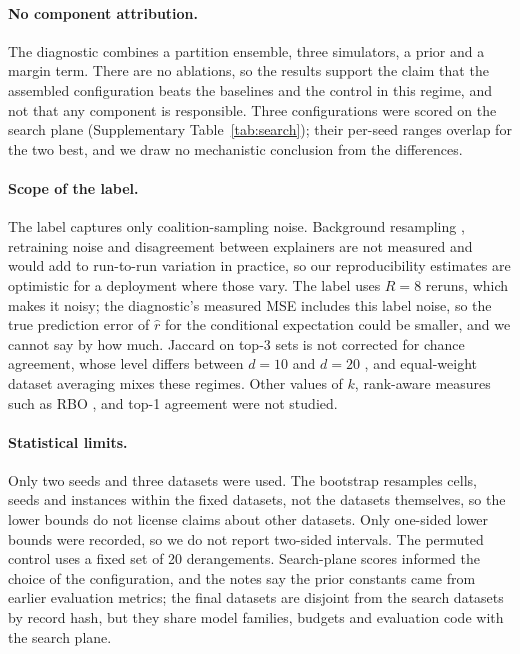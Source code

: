 \documentclass{article}
\newcommand{\rhat}{\hat r}
\begin{document}
\paragraph{No component attribution.}
The diagnostic combines a partition ensemble, three simulators, a prior and a margin term. There are no ablations, so the results support the claim that the assembled configuration beats the baselines and the control in this regime, and not that any component is responsible. Three configurations were scored on the search plane (Supplementary Table~\ref{tab:search}); their per-seed ranges overlap for the two best, and we draw no mechanistic conclusion from the differences.

\paragraph{Scope of the label.}
The label captures only coalition-sampling noise. Background resampling \citep{Yuan2022empirical}, retraining noise and disagreement between explainers \citep{Krishna2022Disagreement} are not measured and would add to run-to-run variation in practice, so our reproducibility estimates are optimistic for a deployment where those vary. The label uses $R=8$ reruns, which makes it noisy; the diagnostic's measured MSE includes this label noise, so the true prediction error of $\rhat$ for the conditional expectation could be smaller, and we cannot say by how much. Jaccard on top-3 sets is not corrected for chance agreement, whose level differs between $d=10$ and $d=20$ \citep{Nogueira2017Stability}, and equal-weight dataset averaging mixes these regimes. Other values of $k$, rank-aware measures such as RBO \citep{Webber2010similarity}, and top-1 agreement were not studied.

\paragraph{Statistical limits.}
Only two seeds and three datasets were used. The bootstrap resamples cells, seeds and instances within the fixed datasets, not the datasets themselves, so the lower bounds do not license claims about other datasets. Only one-sided lower bounds were recorded, so we do not report two-sided intervals. The permuted control uses a fixed set of 20 derangements. Search-plane scores informed the choice of the configuration, and the notes say the prior constants came from earlier evaluation metrics; the final datasets are disjoint from the search datasets by record hash, but they share model families, budgets and evaluation code with the search plane.
\end{document}
